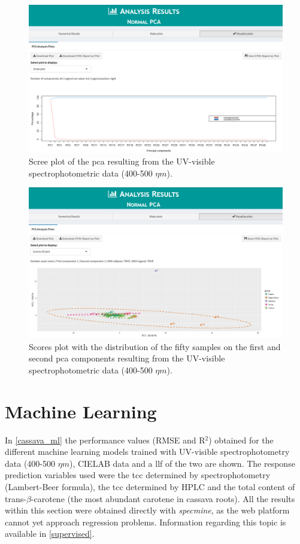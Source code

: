 \begin{figure}[H]
	\centering
	\includegraphics[width=0.8\linewidth]{Imagens/Case_study/pca_scree_plot}
	\caption{Scree plot of the \gls{pca} resulting from the UV-visible spectrophotometric data (400-500 $\eta m$).}
	\label{cassava_pca_scree}
\end{figure}



\begin{figure}[H]
	\centering
	\includegraphics[width=0.8\linewidth]{Imagens/Case_study/pca_scores2Dplot}
	\caption{Scores plot with the distribution of the fifty samples on the first and second \gls{pca} components resulting from the UV-visible spectrophotometric data (400-500 $\eta m$).}
	\label{cassava_pca_scores2D}
\end{figure}


\section{Machine Learning}

In \autoref{cassava_ml} the performance values (RMSE and R$^{2}$) obtained for the different machine learning models trained with UV-visible spectrophotometry data (400-500 $\eta m$), CIELAB data and a \gls{llf} of the two are shown. The response prediction variables used were the \gls{tcc} determined by spectrophotometry (Lambert-Beer formula), the \gls{tcc} determined by HPLC and the total content of trans-$\beta$-carotene (the most abundant carotene in cassava roots). All the results within this section were obtained directly with \textit{specmine}, as the web platform cannot yet approach regression problems. Information regarding this topic is available in \autoref{supervised}.

